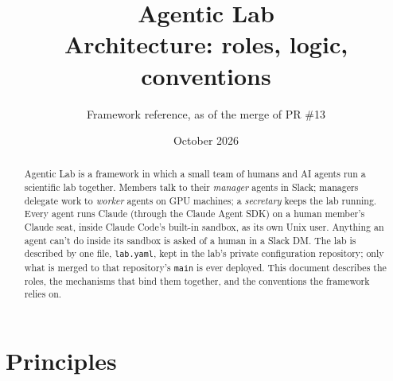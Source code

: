 \documentclass[11pt]{article}
\title{\textbf{Agentic Lab}\\[4pt]\large Architecture: roles, logic, conventions}
\author{Framework reference, as of the merge of PR \#13}
\date{October 2026}
\newcommand{\code}[1]{\texttt{#1}}
\begin{document}
\maketitle

\begin{abstract}
Agentic Lab is a framework in which a small team of humans and AI agents run a scientific
lab together. Members talk to their \emph{manager} agents in Slack; managers delegate work
to \emph{worker} agents on GPU machines; a \emph{secretary} keeps the lab running. Every
agent runs Claude (through the Claude Agent SDK) on a human member's Claude seat, inside
Claude Code's built-in sandbox, as its own Unix user. Anything an agent can't do inside its
sandbox is asked of a human in a Slack DM. The lab is described by one file,
\code{lab.yaml}, kept in the lab's private configuration repository; only what is merged
to that repository's \code{main} is ever deployed. This document describes the roles, the
mechanisms that bind them together, and the conventions the framework relies on.
\end{abstract}

\tableofcontents
\newpage

\section{Principles}
\end{document}
